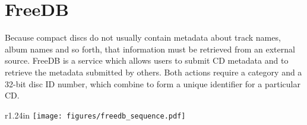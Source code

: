 
\chapter{FreeDB}
Because compact discs do not usually contain metadata about
track names, album names and so forth, that information
must be retrieved from an external source.
FreeDB is a service which allows users to submit CD
metadata and to retrieve the metadata submitted by others.
Both actions require a category and a 32-bit disc ID number,
which combine to form a unique identifier for a particular CD.




\begin{wrapfigure}[18]{r}{1.24in}
\texttt{[image: figures/freedb\_sequence.pdf]}
\end{wrapfigure}
